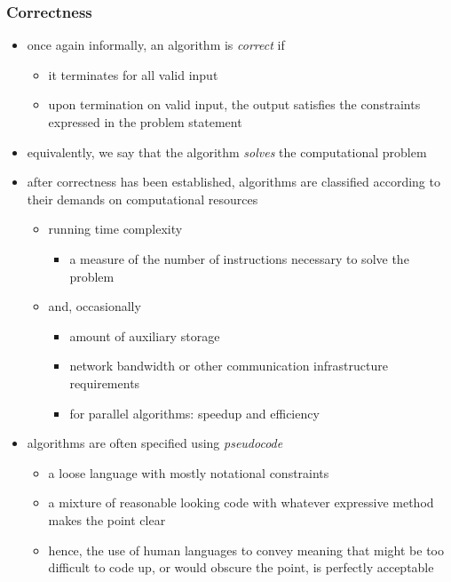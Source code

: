 \begin{frame}[fragile]
%
  \frametitle{Correctness}
%
  \begin{itemize}
%
  \item once again informally, an algorithm is {\em correct} if
    \begin{itemize}
    \item it terminates for all valid input
    \item upon termination on valid input, the output satisfies the constraints expressed in
      the problem statement
    \end{itemize}
%
  \item equivalently, we say that the algorithm {\em solves} the computational problem
%
  \item after correctness has been established, algorithms are classified according to their
    demands on computational resources
    \begin{itemize}
    \item running time complexity
      \begin{itemize}
      \item a measure of the number of instructions necessary to solve the problem
      \end{itemize}
    \item and, occasionally
      \begin{itemize}
      \item amount of auxiliary storage
      \item network bandwidth or other communication infrastructure requirements
      \item for parallel algorithms: speedup and efficiency
      \end{itemize}
    \end{itemize}
%
  \item algorithms are often specified using {\em pseudocode}
    \begin{itemize}
      \item a loose language with mostly notational constraints
      \item a mixture of reasonable looking code with whatever expressive method  makes the
        point clear
      \item hence, the use of human languages to convey meaning that might be too difficult to
        code up, or would obscure the point, is perfectly acceptable
    \end{itemize}
%
  \end{itemize}
%
\end{frame}



